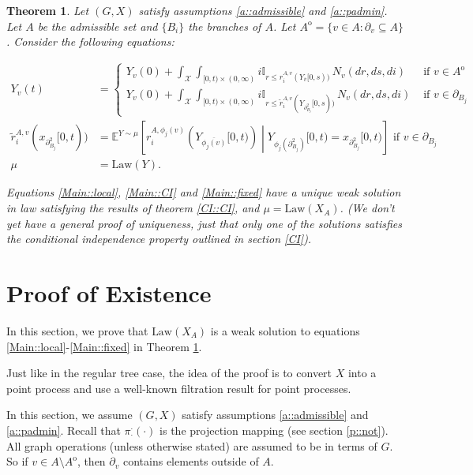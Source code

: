 \documentclass[12pt]{article}
\newcommand{\mb}{\mathbb}
\newcommand{\mc}{\mathcal}
\newcommand{\ov}{\overline}
\newcommand{\te}{\text}
\newcommand{\ind}{\hspace{24pt}}
\newcommand{\exmu}[2]{\mb{E}^{#1}\left[#2\right]}	%
\newcommand{\sta}{\mc{X}}							%
\newcommand{\neigh}[1]{\partial_{#1}}				%
\newcommand{\dneigh}[1]{\partial^2_{#1}}			%
\newcommand{\cl}[1]{\ov{#1}}						%
\newcommand{\Xf}{X}									%
\newcommand{\poiss}{N}								%
\newcommand{\rate}{r}								%
\newcommand{\proj}{\pi}								%
\newcommand{\poissv}[1]{_{#1}}						%
\newcommand{\vind}[1]{_{#1}}						%
\newcommand{\tme}[1]{(#1)}							%
\newcommand{\tmi}[1]{#1}							%
\newcommand{\vpara}[1]{^{#1}}						%
\newcommand{\stpara}[1]{_{#1}}						%
\newcommand{\tpara}[1]{_{#1}}						%
\newcommand{\gvpara}[2]{^{#1,#2}}					%
\newcommand{\Xg}{Y}									%
\newcommand{\brate}{\alt{\rate}}					%
\newcommand{\inte}[1]{{#1}^\mathrm{o}}				%
\newcommand{\alt}[1]{\tilde{#1}}					%
\newcommand{\law}{\te{Law}}							%
\newtheorem{thms}{Theorem}[section]
\begin{document}
\begin{thms}
Let \((G,\Xf)\) satisfy assumptions \ref{a::admissible} and \ref{a::padmin}. Let \(A\) be the admissible set and \(\{B_i\}\) the branches of \(A\). Let \(\inte{A} = \{v \in A: \neigh{v} \subseteq A\}\). Consider the following equations:

\begin{align}
\Xg\vind{v}\tme{t} &= 
\begin{cases}
\Xg\vind{v}\tme{0} + \int_{\sta} \int_{[0,t)\times (0,\infty)} i\mb{I}_{r\leq \rate\gvpara{A}{v}\stpara{i}(\Xg\vind{\cl{v}}\tmi{[0,s)})}\,\poiss\poissv{v}(dr,ds,di) & \te{ if } v \in \inte{A}\\
\Xg\vind{v}\tme{0} + \int_{\sta} \int_{[0,t)\times (0,\infty)} i\mb{I}_{r\leq \brate\gvpara{A}{v}\stpara{i}(\Xg\vind{\dneigh{B_j}}\tmi{[0,s)})}\,\poiss\poissv{v}(dr,ds,di) &\te{ if } v \in \neigh{B_j}
\end{cases}\label{Main::local}\\
\brate\gvpara{A}{v}\stpara{i}(x_{\dneigh{B_j}}[0,t)) &= \exmu{\Xg \sim \mu}{\rate\gvpara{A}{\phi_j(v)}\stpara{i}\left(\Xg\vind{\cl{\phi_j(v)}}\tmi{[0,t)}\right)\middle|\Xg\vind{\phi_j(\dneigh{B_j})}\tmi{[0,t)} = x\vind{\dneigh{B_j}}\tmi{[0,t)}} \te{ if } v \in \neigh{B_j}\label{Main::CI}\\
\mu &= \law(\Xg).\label{Main::fixed}
\end{align}

Equations \eqref{Main::local}, \eqref{Main::CI} and \eqref{Main::fixed} have a unique weak solution in law satisfying the results of theorem \ref{CI::CI}, and \(\mu = \law(\Xf\vind{A})\). (We don't yet have a general proof of uniqueness, just that only one of the solutions satisfies the conditional independence property outlined in section \ref{CI}).
\label{Main::Main}
\end{thms}

\section{Proof of Existence}
\label{Ex}

In this section, we prove that \(\law(\Xf\vind{A})\) is a weak solution to equations \eqref{Main::local}-\eqref{Main::fixed} in Theorem \ref{Main::Main}.

\ind Just like in the regular tree case, the idea of the proof is to convert \(\Xf\) into a point process and use a well-known filtration result for point processes.

\ind In this section, we assume \((G,\Xf)\) satisfy assumptions \ref{a::admissible} and \ref{a::padmin}. Recall that \(\proj\vpara{\cdot}\tpara{\cdot}(\cdot)\) is the projection mapping (see section \ref{p::not}). All graph operations (unless otherwise stated) are assumed to be in terms of \(G\). So if \(v \in A\setminus\inte{A}\), then \(\neigh{v}\) contains elements outside of \(A\).
\end{document}
